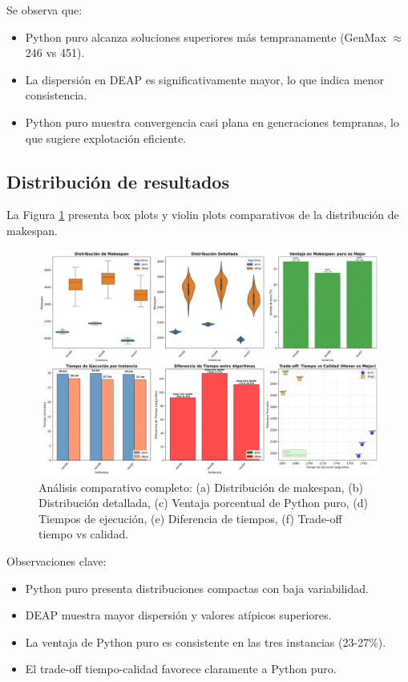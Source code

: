\documentclass[12pt,a4paper]{article}
\begin{document}
Se observa que:
\begin{itemize}
    \item Python puro alcanza soluciones superiores más tempranamente (GenMax $\approx$ 246 vs 451).
    \item La dispersión en DEAP es significativamente mayor, lo que indica menor consistencia.
    \item Python puro muestra convergencia casi plana en generaciones tempranas, lo que sugiere explotación eficiente.
\end{itemize}

\subsection{Distribución de resultados}

La Figura \ref{fig:distribucion} presenta box plots y violin plots comparativos de la distribución de makespan.

\begin{figure}[H]
    \centering
    \includegraphics[width=\textwidth]{Figuras/comparativa_completa.png}
    \caption{Análisis comparativo completo: (a) Distribución de makespan, (b) Distribución detallada, (c) Ventaja porcentual de Python puro, (d) Tiempos de ejecución, (e) Diferencia de tiempos, (f) Trade-off tiempo vs calidad.}
    \label{fig:distribucion}
\end{figure}

Observaciones clave:
\begin{itemize}
    \item Python puro presenta distribuciones compactas con baja variabilidad.
    \item DEAP muestra mayor dispersión y valores atípicos superiores.
    \item La ventaja de Python puro es consistente en las tres instancias (23-27\%).
    \item El trade-off tiempo-calidad favorece claramente a Python puro.
\end{itemize}
\end{document}
